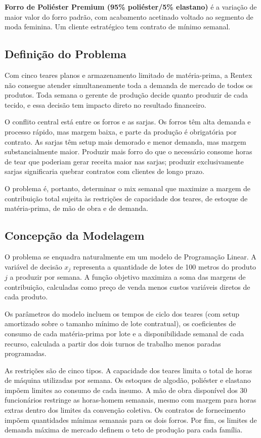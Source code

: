 \textbf{Forro de Poliéster Premium (95\% poliéster/5\% elastano)} é a variação
de maior valor do forro padrão, com acabamento acetinado voltado ao segmento de
moda feminina. Um cliente estratégico tem contrato de mínimo semanal.

\subsection{Definição do Problema}

Com cinco teares planos e armazenamento limitado de matéria-prima, a Rentex não
consegue atender simultaneamente toda a demanda de mercado de todos os produtos.
Toda semana o gerente de produção decide quanto produzir de cada tecido, e essa
decisão tem impacto direto no resultado financeiro.

O conflito central está entre os forros e as sarjas. Os forros têm alta demanda
e processo rápido, mas margem baixa, e parte da produção é obrigatória por
contrato. As sarjas têm setup mais demorado e menor demanda, mas margem
substancialmente maior. Produzir mais forro do que o necessário consome horas de
tear que poderiam gerar receita maior nas sarjas; produzir exclusivamente sarjas
significaria quebrar contratos com clientes de longo prazo.

O problema é, portanto, determinar o mix semanal que maximize a margem de
contribuição total sujeita às restrições de capacidade dos teares, de estoque
de matéria-prima, de mão de obra e de demanda.

\subsection{Concepção da Modelagem}

O problema se enquadra naturalmente em um modelo de Programação Linear. A
variável de decisão $x_j$ representa a quantidade de lotes de 100 metros do
produto $j$ a produzir por semana. A função objetivo maximiza a soma das margens
de contribuição, calculadas como preço de venda menos custos variáveis diretos
de cada produto.

Os parâmetros do modelo incluem os tempos de ciclo dos teares (com setup
amortizado sobre o tamanho mínimo de lote contratual), os coeficientes de
consumo de cada matéria-prima por lote e a disponibilidade semanal de cada
recurso, calculada a partir dos dois turnos de trabalho menos paradas programadas.

As restrições são de cinco tipos. A capacidade dos teares limita o total de
horas de máquina utilizadas por semana. Os estoques de algodão, poliéster e
elastano impõem limites ao consumo de cada insumo. A mão de obra disponível
dos 30 funcionários restringe as horas-homem semanais, mesmo com margem para
horas extras dentro dos limites da convenção coletiva. Os contratos de
fornecimento impõem quantidades mínimas semanais para os dois forros. Por fim,
os limites de demanda máxima de mercado definem o teto de produção para cada
família.

